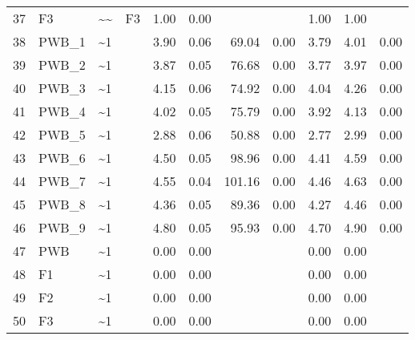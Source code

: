 \documentclass{article}
\begin{document}
\begin{table}[ht]
\begin{tabular}{rlllrrrrrrr}
  37 & F3 & \~{}\~{} & F3 & 1.00 & 0.00 &  &  & 1.00 & 1.00 &  \\ 
  38 & PWB\_1 & \~{}1 &  & 3.90 & 0.06 & 69.04 & 0.00 & 3.79 & 4.01 & 0.00 \\ 
  39 & PWB\_2 & \~{}1 &  & 3.87 & 0.05 & 76.68 & 0.00 & 3.77 & 3.97 & 0.00 \\ 
  40 & PWB\_3 & \~{}1 &  & 4.15 & 0.06 & 74.92 & 0.00 & 4.04 & 4.26 & 0.00 \\ 
  41 & PWB\_4 & \~{}1 &  & 4.02 & 0.05 & 75.79 & 0.00 & 3.92 & 4.13 & 0.00 \\ 
  42 & PWB\_5 & \~{}1 &  & 2.88 & 0.06 & 50.88 & 0.00 & 2.77 & 2.99 & 0.00 \\ 
  43 & PWB\_6 & \~{}1 &  & 4.50 & 0.05 & 98.96 & 0.00 & 4.41 & 4.59 & 0.00 \\ 
  44 & PWB\_7 & \~{}1 &  & 4.55 & 0.04 & 101.16 & 0.00 & 4.46 & 4.63 & 0.00 \\ 
  45 & PWB\_8 & \~{}1 &  & 4.36 & 0.05 & 89.36 & 0.00 & 4.27 & 4.46 & 0.00 \\ 
  46 & PWB\_9 & \~{}1 &  & 4.80 & 0.05 & 95.93 & 0.00 & 4.70 & 4.90 & 0.00 \\ 
  47 & PWB & \~{}1 &  & 0.00 & 0.00 &  &  & 0.00 & 0.00 &  \\ 
  48 & F1 & \~{}1 &  & 0.00 & 0.00 &  &  & 0.00 & 0.00 &  \\ 
  49 & F2 & \~{}1 &  & 0.00 & 0.00 &  &  & 0.00 & 0.00 &  \\ 
  50 & F3 & \~{}1 &  & 0.00 & 0.00 &  &  & 0.00 & 0.00 &  \\ 
   \hline
\end{tabular}
\end{table}
\end{document}
